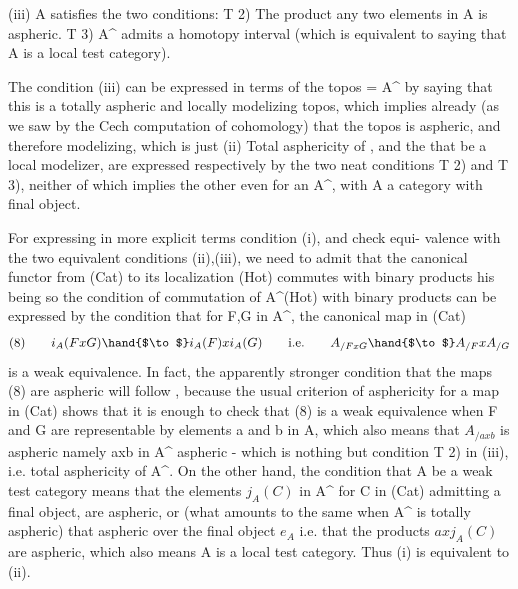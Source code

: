  

(iii)  A satisfies the two conditions:
T 2) The product   any two elements in A is aspheric.
T 3) A\^{} admits a homotopy interval (which is equivalent to
saying that A is a local test category).

 The condition (iii) can be expressed in terms of the topos  = A\^{}
by saying that this is a totally aspheric and locally modelizing topos,
which implies already (as we saw by the \hand{\v{}}Cech computation of cohomology)
that the topos is aspheric, and therefore modelizing, which is just (ii)
 Total asphericity of  , and the  that  be a local modelizer, are
expressed respectively by the two neat conditions T 2) and T 3), neither
of which implies the other even for an A\^{}, with A a category with final
object. 

For expressing in more explicit terms condition (i), and check equi-%
valence with the two equivalent conditions (ii),(iii), we need to 
admit that the canonical functor from (Cat) to its localization (Hot)
commutes with binary products his being so\hand{,} the condition of commutation
of A\^{}\hand{$\to$}(Hot) with binary products can be expressed by the  condition that
for F,G in A\^{}, the canonical map in (Cat)
\[ (8) \qquad i_A(FxG)\hand{$\to$} i_A(F)xi_A(G) \qquad \text{i.e.} \qquad A_{/FxG}\hand{$\to$} A_{/F}xA_{/G} \]
is a weak equivalence. In fact, the apparently stronger condition
that the maps (8) are aspheric will follow , because the usual criterion
of asphericity for a map in (Cat) shows that it is enough  to check that
(8) is a weak equivalence when F and G are representable by elements\xout{\unsure{:}}
a and b in A, which also means that $A_{/axb}$ is aspheric namely axb in A\^{}
aspheric - which is nothing but condition T 2) in (iii), 
i.e. total asphericity of A\^{}. On the other hand, the condition that A
be a weak test category means that the elements $j_A(C)$ in A\^{}\hand{,} for C in
(Cat) admitting a final object, are aspheric, or (what amounts to the
same when A\^{} is totally aspheric) that  aspheric over the final
object $e_{A\hat{}}$ i.e. that the products $axj_A(C)$ are aspheric, which also 
means A is a local test category. Thus (i)  is equivalent to (ii).

